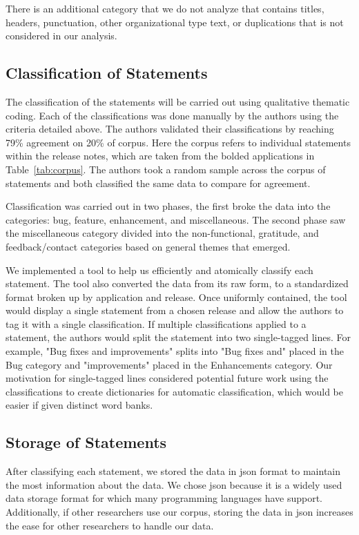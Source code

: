 \documentclass{acm_proc_article-sp}
\begin{document}
There is an additional category that we do not analyze that contains titles, headers, punctuation, other organizational type text, or duplications that is not considered in our analysis.

\subsection{Classification of Statements}
The classification of the statements will be carried out using qualitative thematic coding. 
Each of the classifications was done manually by the authors using the criteria detailed above.
The authors validated their classifications by reaching 79\% agreement on 20\% of corpus.
Here the corpus refers to individual statements within the release notes, which are taken from the bolded applications in Table~\ref{tab:corpus}.
The authors took a random sample across the corpus of statements and both classified the same data to compare for agreement. 

Classification was carried out in two phases, the first broke the data into the categories: bug, feature, enhancement, and miscellaneous.
The second phase saw the miscellaneous category divided into the non-functional, gratitude, and feedback/contact categories based on general themes that emerged.

We implemented a tool to help us efficiently and atomically classify each statement.
The tool also converted the data from its raw form, to a standardized format broken up by application and release.
Once uniformly contained, the tool would display a single statement from a chosen release and allow the authors to tag it with a single classification. 
If multiple classifications applied to a statement, the authors would split the statement into two single-tagged lines.
For example, "Bug fixes and improvements" splits into "Bug fixes and" placed in the Bug category and "improvements" placed in the Enhancements category.
Our motivation for single-tagged lines considered potential future work using the classifications to create dictionaries for automatic classification, which would be easier if given distinct word banks.



\subsection{Storage of Statements}
After classifying each statement, we stored the data in json format to maintain the most information about the data.
We chose json because it is a widely used data storage format for which many programming languages have support. 
Additionally, if other researchers use our corpus, storing the data in json increases the ease for other researchers to handle our data.
\end{document}
